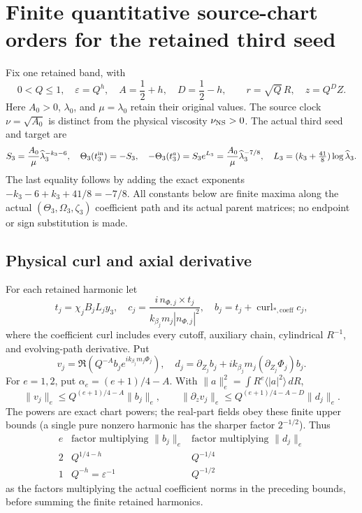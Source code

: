 \documentclass[11pt]{article}
\begin{document}
\section{Finite quantitative source-chart orders for the retained third seed}
\label{qext:setup}
Fix one retained band, with
\[
0<Q\le1,\quad\varepsilon=Q^h,\quad A=\frac12+h,\quad D=\frac12-h,
\qquad r=\sqrt Q\,R,\quad z=Q^D Z .
\]
Here \(A_0>0\), \(\lambda _0\), and \(\mu=\lambda _0\) retain their original
values.  The source clock \(\nu=\sqrt{A_0}\) is distinct from the physical
viscosity \(\nu_{\rm NS}>0\).  The actual third seed and target are
\[
S_3=\frac{A_0}{\mu}\widehat\lambda _3^{-k_3-6},\quad
\Theta_3(t_3^{\rm in})=-S_3,\quad
-\Theta_3(t_3^a)=S_3e^{L_3}
=\frac{A_0}{\mu}\widehat\lambda _3^{-7/8},\quad
L_3=(k_3+\tfrac{41}{8})\log\widehat\lambda _3 .
\]
The last equality follows by adding the exact exponents
\(-k_3-6+k_3+41/8=-7/8\).  All constants below are finite maxima along
the actual \((\Theta_3,\Omega_3,\zeta_3)\) coefficient path and its actual
parent matrices; no endpoint or sign substitution is made.

\subsection{Physical curl and axial derivative}
For each retained harmonic let
\[
t_j=\chi_jB_jL_jy_3,\quad
c_j=\frac{i\,n_{\Phi,j}\times t_j}{k_{\beta_j}m_j|n_{\Phi,j}|^2},\quad
b_j=t_j+\operatorname{curl}_{*,\mathrm{coeff}}c_j,
\]
where the coefficient curl includes every cutoff, auxiliary chain,
cylindrical \(R^{-1}\), and evolving-path derivative.  Put
\[
v_j=\Re(Q^{-A}b_je^{ik_{\beta_j}m_j\Phi_j}),\quad
d_j=\partial_{Z_j}b_j+ik_{\beta_j}m_j(\partial_{Z_j}\Phi_j)b_j .
\]
For \(e=1,2\), put \(\alpha_e=(e+1)/4-A\). With \(\|a\|_e^2=\int R^e\langle|a|^2\rangle\,dR\),
\[
\|v_j\|_e\le Q^{(e+1)/4-A}\|b_j\|_e,\qquad
\|\partial_zv_j\|_e\le Q^{(e+1)/4-A-D}\|d_j\|_e .
\]
The powers are exact chart powers; the real-part fields obey these finite
upper bounds (a single pure nonzero harmonic has the sharper factor
\(2^{-1/2}\)).  Thus
\[
\begin{array}{c|cc}
e&\text{factor multiplying }\|b_j\|_e&\text{factor multiplying }\|d_j\|_e\\ \hline
2&Q^{1/4-h}&Q^{-1/4}\\
1&Q^{-h}=\varepsilon^{-1}&Q^{-1/2}
\end{array}
\]
as the factors multiplying the actual coefficient norms in the preceding bounds, before summing the finite retained harmonics.
\end{document}
